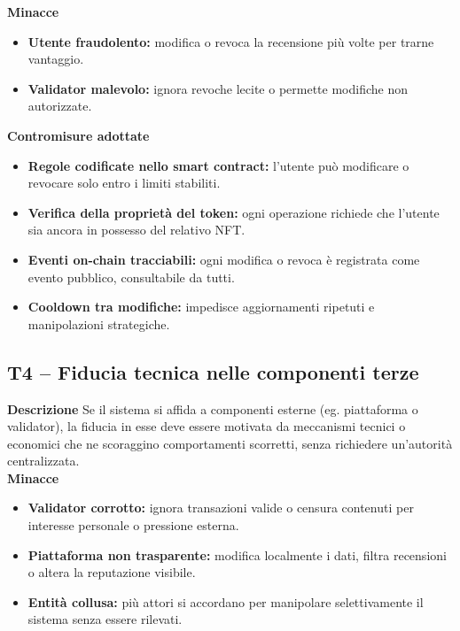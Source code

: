            \noindent \textbf{Minacce}
                \begin{itemize}
                    \item \textbf{Utente fraudolento:} modifica o revoca la recensione più volte per trarne vantaggio.

                    \item \textbf{Validator malevolo:} ignora revoche lecite o permette modifiche non autorizzate.
                \end{itemize}

            \noindent \textbf{Contromisure adottate}
                \begin{itemize}
                    \item \textbf{Regole codificate nello smart contract:} l'utente può modificare o revocare solo entro i limiti stabiliti.

                    \item \textbf{Verifica della proprietà del token:} ogni operazione richiede che l'utente sia ancora in possesso del relativo NFT.

                    \item \textbf{Eventi on-chain tracciabili:} ogni modifica o revoca è registrata come evento pubblico, consultabile da tutti.

                    \item \textbf{Cooldown tra modifiche:} impedisce aggiornamenti ripetuti e manipolazioni strategiche.
                \end{itemize}

        \subsection{T4 – Fiducia tecnica nelle componenti terze}
            \noindent \textbf{Descrizione}
                Se il sistema si affida a componenti esterne (eg. piattaforma o validator), la fiducia in esse deve essere motivata da meccanismi tecnici o economici che ne scoraggino comportamenti scorretti, senza richiedere un'autorità centralizzata. \\

            \noindent \textbf{Minacce}
                \begin{itemize}
                    \item \textbf{Validator corrotto:} ignora transazioni valide o censura contenuti per interesse personale o pressione esterna.

                    \item \textbf{Piattaforma non trasparente:} modifica localmente i dati, filtra recensioni o altera la reputazione visibile.

                    \item \textbf{Entità collusa:} più attori si accordano per manipolare selettivamente il sistema senza essere rilevati.
                \end{itemize}

